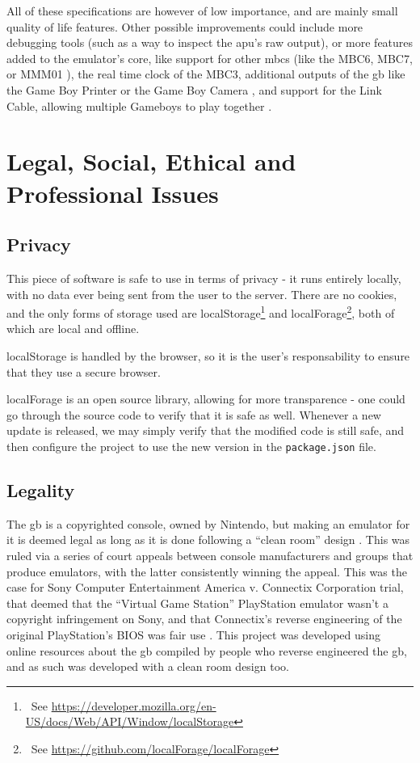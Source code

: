 \documentclass[11pt]{informatics-report}
\newcommand{\ftnt}[1]{\footnote{~See \url{#1}}}
\begin{document}
All of these specifications are however of low importance, and are mainly small quality of life features. Other possible improvements could include more debugging tools (such as a way to inspect the \gls{apu}'s raw output), or more features added to the emulator's core, like support for other \glspl{mbc} (like the MBC6, MBC7, or MMM01 \cite[MBCs]{pandoc}), the real time clock of the MBC3, additional outputs of the \gls{gb} like the Game Boy Printer or the Game Boy Camera \cite{pandoc}, and support for the Link Cable, allowing multiple Gameboys to play together \cite[Serial Data Transfer]{pandoc}.

\chapter{Legal, Social, Ethical and Professional Issues}

\section{Privacy}

This piece of software is safe to use in terms of privacy - it runs entirely locally, with no data ever being sent from the user to the server. There are no cookies, and the only forms of storage used are localStorage\ftnt{https://developer.mozilla.org/en-US/docs/Web/API/Window/localStorage} and localForage\ftnt{https://github.com/localForage/localForage}, both of which are local and offline. 

localStorage is handled by the browser, so it is the user's responsability to ensure that they use a secure browser. 

localForage is an open source library, allowing for more transparence - one could go through the source code to verify that it is safe as well. Whenever a new update is released, we may simply verify that the modified code is still safe, and then configure the project to use the new version in the \texttt{package.json} file.

\section{Legality}

The \glsdesc{gb} is a copyrighted console, owned by Nintendo, but making an emulator for it is deemed legal as long as it is done following a ``clean room'' design \cite{emulation_white_paper}. This was ruled via a series of court appeals between console manufacturers and groups that produce emulators, with the latter consistently winning the appeal. This was the case for Sony Computer Entertainment America v. Connectix Corporation trial, that deemed that the ``Virtual Game Station'' PlayStation emulator wasn't a copyright infringement on Sony, and that Connectix's reverse engineering of the original PlayStation's BIOS was fair use \cite{sony_v_connectix}. This project was developed using online resources about the \gls{gb} compiled by people who reverse engineered the \gls{gb}, and as such was developed with a clean room design too.
\end{document}
